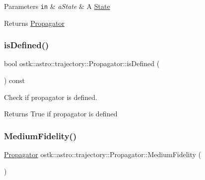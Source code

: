 \begin{DoxyParams}[1]{Parameters}
\mbox{\tt in}  & {\em a\+State} & A \hyperlink{classostk_1_1astro_1_1trajectory_1_1_state}{State} \\
\hline
\end{DoxyParams}
\begin{DoxyReturn}{Returns}
\hyperlink{classostk_1_1astro_1_1trajectory_1_1_propagator}{Propagator} 
\end{DoxyReturn}
\mbox{\label{classostk_1_1astro_1_1trajectory_1_1_propagator_a52140a4499899dda02e5c73179975e53}} 
\subsubsection{\texorpdfstring{is\+Defined()}{isDefined()}}
{\footnotesize\ttfamily bool ostk\+::astro\+::trajectory\+::\+Propagator\+::is\+Defined (\begin{DoxyParamCaption}{ }\end{DoxyParamCaption}) const}



Check if propagator is defined. 

\begin{DoxyReturn}{Returns}
True if propagator is defined 
\end{DoxyReturn}
\mbox{\label{classostk_1_1astro_1_1trajectory_1_1_propagator_a8d807b90b10f02edb732afe28dca0c04}} 
\subsubsection{\texorpdfstring{Medium\+Fidelity()}{MediumFidelity()}}
{\footnotesize\ttfamily \hyperlink{classostk_1_1astro_1_1trajectory_1_1_propagator}{Propagator} ostk\+::astro\+::trajectory\+::\+Propagator\+::\+Medium\+Fidelity (\begin{DoxyParamCaption}{ }\end{DoxyParamCaption})\hspace{0.3cm}{\ttfamily [static]}}



